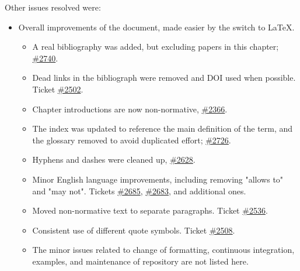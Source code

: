 Other issues resolved were:
\begin{itemize}
\item Overall improvements of the document, made easier by the switch to \LaTeX.
\begin{itemize}
\item A real bibliography was added, but excluding papers in this chapter; \href{https://github.com/modelica/ModelicaSpecification/pull/2740}{\#2740}.
\item Dead links in the bibliograph were removed and DOI used when possible.
Ticket \href{https://github.com/modelica/ModelicaSpecification/pull/2502}{\#2502}.
\item Chapter introductions are now non-normative, \href{https://github.com/modelica/ModelicaSpecification/issues/2366}{\#2366}.
\item The index was updated to reference the main definition of the term, and the glossary removed to avoid duplicated effort; \href{https://github.com/modelica/ModelicaSpecification/pull/2726}{\#2726}.
\item Hyphens and dashes were cleaned up, \href{https://github.com/modelica/ModelicaSpecification/pull/2628}{\#2628}.
\item Minor English language improvements, including removing "allows to" and "may not".
Tickets \href{https://github.com/modelica/ModelicaSpecification/issues/2685}{\#2685}, \href{https://github.com/modelica/ModelicaSpecification/issues/2683}{\#2683}, and additional ones.
\item Moved non-normative text to separate paragraphs.
Ticket \href{https://github.com/modelica/ModelicaSpecification/issues/2536}{\#2536}.
\item Consistent use of different quote symbols.
Ticket \href{https://github.com/modelica/ModelicaSpecification/pull/2508}{\#2508}.
\item The minor issues related to change of formatting, continuous integration, examples, and maintenance of repository are not listed here.
\end{itemize}


\end{itemize}

